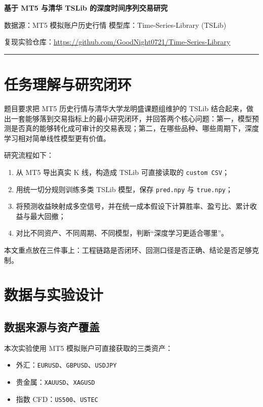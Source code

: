 \documentclass[11pt,a4paper]{ctexart}
\begin{document}
\begin{center}
  {\bfseries 基于 MT5 与清华 TSLib 的深度时间序列交易研究\par}
  \vspace{0.7em}
  {\small 数据源：MT5 模拟账户历史行情 \quad 模型库：Time-Series-Library (TSLib)\par}
  \vspace{0.25em}
  {\small 复现实验仓库：\url{https://github.com/GoodNight0721/Time-Series-Library}\par}
\end{center}

\vspace{0.6em}
\hrule
\vspace{0.9em}

\section{任务理解与研究闭环}

题目要求把 MT5 历史行情与清华大学龙明盛课题组维护的 TSLib 结合起来，做出一套能够落到交易指标上的最小研究闭环，并回答两个核心问题：第一，模型预测是否真的能够转化成可审计的交易表现；第二，在哪些品种、哪些周期下，深度学习相对简单线性模型更有价值。

研究流程如下：
\begin{enumerate}
  \item 从 MT5 导出真实 K 线，构造成 TSLib 可直接读取的 \texttt{custom CSV}；
  \item 用统一切分规则训练多类 TSLib 模型，保存 \texttt{pred.npy} 与 \texttt{true.npy}；
  \item 将预测收益映射成多空信号，并在统一成本假设下计算胜率、盈亏比、累计收益与最大回撤；
  \item 对比不同资产、不同周期、不同模型，判断“深度学习更适合哪里”。
\end{enumerate}

本文重点放在三件事上：工程链路是否闭环、回测口径是否正确、结论是否足够克制。

\section{数据与实验设计}

\subsection{数据来源与资产覆盖}

本次实验使用 MT5 模拟账户可直接获取的三类资产：
\begin{itemize}
  \item 外汇：\texttt{EURUSD}、\texttt{GBPUSD}、\texttt{USDJPY}
  \item 贵金属：\texttt{XAUUSD}、\texttt{XAGUSD}
  \item 指数 CFD：\texttt{US500}、\texttt{USTEC}
\end{itemize}
\end{document}
